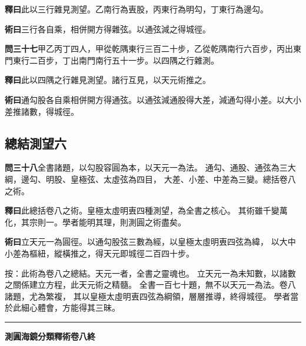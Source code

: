 \documentclass[12pt,a4paper]{article}
\newcommand{\Section}[1]{\subsection*{#1}}
\begin{document}
\vspace{0.3em}

\noindent\textbf{釋曰}\quad 此以三行雜見測望。乙南行為叀股，丙東行為明勾，丁東行為邊勾。

\vspace{0.3em}

\noindent\textbf{術曰}\quad 三行各自乘，相併開方得雜弦。以通弦減之得城徑。

\vspace{0.5em}

\noindent\textbf{問三十七}\quad 甲乙丙丁四人，甲從乾隅東行三百二十步，乙從乾隅南行六百步，丙出東門東行二百步，丁出南門南行五十一步。以四隅之行雜測。

\vspace{0.3em}

\noindent\textbf{釋曰}\quad 此以四隅之行雜見測望。諸行互見，以天元術推之。

\vspace{0.3em}

\noindent\textbf{術曰}\quad 通勾股各自乘相併開方得通弦。以通弦減通股得大差，減通勾得小差。以大小差推諸數，得城徑。

\Section{總結測望六}

\noindent\textbf{問三十八}\quad 全書諸題，以勾股容圓為本，以天元一為法。
通勾、通股、通弦為三大綱，邊勾、明股、皇極弦、太虛弦為四目，
大差、小差、中差為三變。總括卷八之術。

\vspace{0.3em}

\noindent\textbf{釋曰}\quad 此總括卷八之術。皇極太虛明叀四種測望，為全書之核心。
其術雖千變萬化，其宗則一。學者能明其理，則測圓之術盡矣。

\vspace{0.3em}

\noindent\textbf{術曰}\quad 立天元一為圓徑。以通勾股弦三數為經，以皇極太虛明叀四弦為緯，
以大中小差為樞紐，縱橫推之，得天元即城徑二百四十步。

\vspace{0.3em}

\noindent
按：此術為卷八之總結。天元一者，全書之靈魂也。
立天元一為未知數，以諸數之關係建立方程，此天元術之精髓。
全書一百七十題，無不以天元一為法。卷八諸題，尤為繁複，
其以皇極太虛明叀四弦為綱領，層層推導，終得城徑。
學者當於此細心體會，方能得其三昧。

\vspace{1em}
\begin{center}
\rule{0.5\textwidth}{0.4pt}

\textbf{測圓海鏡分類釋術卷八終}
\end{center}
\end{document}
